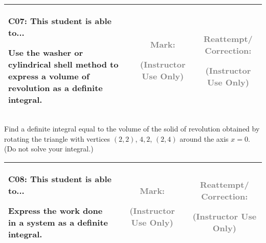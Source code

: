 \documentclass[12pt]{article}
\newcommand{\standardQuestion}[2]{
\newpage
\begin{center}
  \begin{tabular}{|l|c|c|}
  \hline
    \parbox{4in}{
      \textbf{#1}: This student is able to...\\
      #2
    }
  &
    \parbox{1in}{
      \vspace{0.1in}
      \footnotesize \textcolor{gray}{Mark:}
      \vspace{0.7in}

      \tiny \textcolor{gray}{(Instructor Use Only)}
    }
  &
    \parbox{1in}{
      \vspace{0.1in}
      \footnotesize \textcolor{gray}{Reattempt/ Correction:}
      \vspace{0.53in}

      \tiny \textcolor{gray}{(Instructor Use Only)}
    }
  \\\hline
  \end{tabular}
\end{center}
}
\begin{document}
%
%
%
%
%
%
%
%
%
%
%



\standardQuestion{C07}{
  Use the washer or cylindrical shell method to express a volume of
  revolution as a definite integral.
}

Find a definite integral equal to the volume of
the solid of revolution obtained by rotating
the triangle with vertices \((2,2)\), \(4,2\), \((2,4)\) around the
axis \(x=0\).
(Do not solve your integral.)




\standardQuestion{C08}{
  Express the work done in a system as a definite integral.
}
\end{document}
